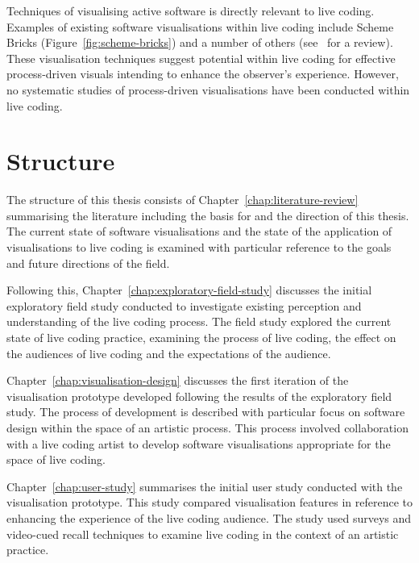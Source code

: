 Techniques of visualising active software is directly relevant to live coding. Examples of existing software visualisations within live coding include Scheme Bricks (Figure~\ref{fig:scheme-bricks}) and a number of others (see~\cite{McLean2010a} for a review). These visualisation techniques suggest potential within live coding for effective process-driven visuals intending to enhance the observer's experience. However, no systematic studies of process-driven visualisations have been conducted within live coding.


\section{Structure}

The structure of this thesis consists of Chapter~\ref{chap:literature-review} summarising the literature including the basis for and the direction of this thesis. The current state of software visualisations and the state of the application of visualisations to live coding is examined with particular reference to the goals and future directions of the field.

Following this, Chapter~\ref{chap:exploratory-field-study} discusses the initial exploratory field study conducted to investigate existing perception and understanding of the live coding process. The field study explored the current state of live coding practice, examining the process of live coding, the effect on the audiences of live coding and the expectations of the audience.

Chapter~\ref{chap:visualisation-design} discusses the first iteration of the visualisation prototype developed following the results of the exploratory field study. The process of development is described with particular focus on software design within the space of an artistic process. This process involved collaboration with a live coding artist to develop software visualisations appropriate for the space of live coding.

Chapter~\ref{chap:user-study} summarises the initial user study conducted with the visualisation prototype. This study compared visualisation features in reference to enhancing the experience of the live coding audience. The study used surveys and video-cued recall techniques to examine live coding in the context of an artistic practice.

